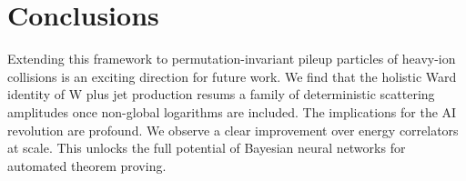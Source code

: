 \section{Conclusions}\label{sec:conclusions}

Extending this framework to permutation-invariant pileup particles of
heavy-ion collisions is an exciting direction for future work. We find
that the holistic Ward identity of W plus jet production resums a family
of deterministic scattering amplitudes once non-global logarithms are
included. The implications for the AI revolution are profound. We
observe a clear improvement over energy correlators at scale. This
unlocks the full potential of Bayesian neural networks for automated
theorem proving.

